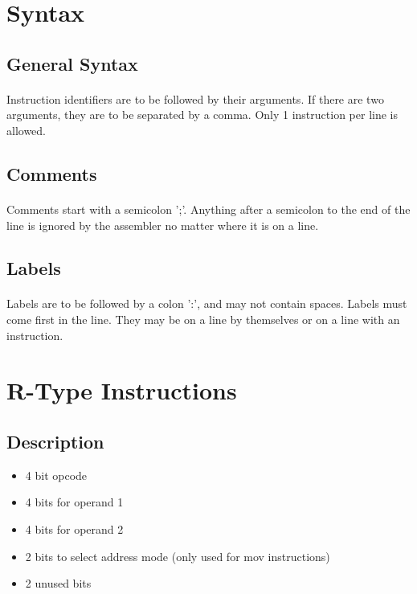 \documentclass[a4paper]{article}
\begin{document}
\section{Syntax}
\subsection{General Syntax}
\paragraph{}
Instruction identifiers are to be followed by their arguments. If there are two arguments, they are to be separated by a comma. Only 1 instruction per line is allowed.

\subsection{Comments}
\paragraph{}
Comments start with a semicolon ';'. Anything after a semicolon to the end of the line is ignored by the assembler no matter where it is on a line.

\subsection{Labels}
\paragraph{}
Labels are to be followed by a colon ':', and may not contain spaces. Labels must come first in the line. They may be on a line by themselves or on a line with an instruction.


\section{R-Type Instructions}

\subsection{Description}

\begin{itemize}
\item 4 bit opcode
\item 4 bits for operand 1
\item 4 bits for operand 2
\item 2 bits to select address mode (only used for mov instructions)
\item 2 unused bits
\end{itemize}
\end{document}

